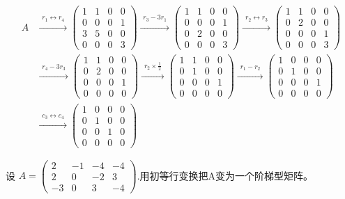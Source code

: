 \documentclass[a4paper]{report}
\begin{document}
\begin{jie}
\begin{align*}
A&\xrightarrow{\substack{r_{1}\leftrightarrow r_{4}}}
{
\begin{pmatrix}
1&1&0&0\\
0&0&0&1\\
3&5&0&0\\
0&0&0&3
\end{pmatrix}
}\xrightarrow{\substack{r_{3}-3r_{1}}}
{
\begin{pmatrix}
1&1&0&0\\
0&0&0&1\\
0&2&0&0\\
0&0&0&3
\end{pmatrix}
}\xrightarrow{\substack{r_{2}\leftrightarrow r_{3}}}
{
\begin{pmatrix}
1&1&0&0\\
0&2&0&0\\
0&0&0&1\\
0&0&0&3
\end{pmatrix}
}\\ &\xrightarrow{\substack{r_{4}-3r_{3}}}
{
\begin{pmatrix}
1&1&0&0\\
0&2&0&0\\
0&0&0&1\\
0&0&0&0
\end{pmatrix}
}\xrightarrow{\substack{r_{2}\times \frac{1}{2}}}
{
\begin{pmatrix}
1&1&0&0\\
0&1&0&0\\
0&0&0&1\\
0&0&0&0
\end{pmatrix}
}\xrightarrow{\substack{r_{1}-r_{2}}}
{
\begin{pmatrix}
1&0&0&0\\
0&1&0&0\\
0&0&0&1\\
0&0&0&0
\end{pmatrix}
}\\ &\xrightarrow{\substack{c_{3}\leftrightarrow c_{4}}}
{
\begin{pmatrix}
1&0&0&0\\
0&1&0&0\\
0&0&1&0\\
0&0&0&0
\end{pmatrix}
}
\end{align*}
\end{jie}

\EX 设
$
A=
\begin{pmatrix}
2&-1&-4&-4\\
2&0&-2&3\\
-3&0&3&-4
\end{pmatrix}
$.用初等行变换把A变为一个阶梯型矩阵。
\end{document}
